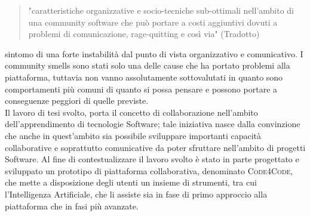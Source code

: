 \begin{quotation}
"caratteristiche organizzative e socio-tecniche sub-ottimali nell'ambito di una community software che può portare a costi aggiuntivi dovuti a problemi di comunicazione, rage-quitting e così via" (Tradotto)
\cite{CommunitySmells}   
\end{quotation}
sintomo di una forte instabilità dal punto di vista organizzativo e comunicativo. I community smells sono stati solo una delle cause che ha portato problemi alla piattaforma, tuttavia non vanno assolutamente sottovalutati in quanto sono comportamenti più comuni di quanto si possa pensare e possono portare a conseguenze peggiori di quelle previste.\\
Il lavoro di tesi svolto, porta il concetto di collaborazione nell'ambito dell'apprendimento di tecnologie Software; tale iniziativa nasce dalla convinzione che anche in quest'ambito sia possibile sviluppare importanti capacità collaborative e soprattutto comunicative da poter sfruttare nell'ambito di progetti Software. Al fine di contestualizzare il lavoro svolto è stato in parte progettato e sviluppato un prototipo di piattaforma collaborativa, denominato \textsc{Code4Code}, che mette a disposizione degli utenti un insieme di strumenti, tra cui l'Intelligenza Artificiale, che li assiste sia in fase di primo approccio alla piattaforma che in fasi più avanzate.  
